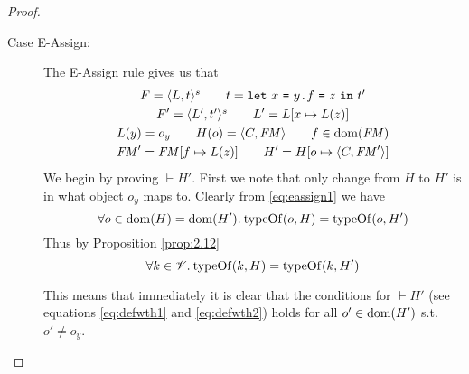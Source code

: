 \begin{proof}
\begin{description}
\begin{description}
\begin{description}
            \item[Case {\sc E-Assign}:] The {\sc E-Assign} rule gives us that
              \begin{equation} \label{eq:eassign1}
                \begin{gathered}
                  F = \mbox{$\langle L, t \rangle^s$} \quad\quad t = \mbox{\mdseries\texttt{let}~$x$~\texttt{=}~$\mbox{\mdseries$y$\texttt{.}$f$~\texttt{=}~$z$}$~\texttt{in}~$t'$} \\
                  F' = \mbox{$\langle L', t' \rangle^s$} \quad\quad L' = L[x \mapsto L(z)] \\
                  L(y) = o_y \quad\quad H(o) = \mbox{$\langle C, \mathit{FM} \rangle$} \quad\quad f \in \mbox{$\mathrm{dom}$}(\mathit{FM})
                  \\
                  \mathit{FM}' = \mathit{FM}[f \mapsto L(z)] \quad\quad H' = H[o \mapsto \mbox{$\langle C, \mathit{FM}' \rangle$}]
                \end{gathered}
              \end{equation}
              We begin by proving $\vdash H'$. First we note
              that only change from $H$ to $H'$ is in what object $o_y$ maps to.
              Clearly from \eqref{eq:eassign1} we have
              \begin{equation} \label{eq:eassign2}
                \forall o \in \mbox{$\mathrm{dom}$}(H) = \mbox{$\mathrm{dom}$}(H'). \: \mbox{$\mathrm{typeOf}$}(o, H) = \mbox{$\mathrm{typeOf}$}(o,
                H')
              \end{equation}
              Thus by Proposition \ref{prop:2.12} 
              \begin{equation} \label{eq:eassign3}
                \forall k \in \mathscr{V}. \: \mbox{$\mathrm{typeOf}$}(k, H) = \mbox{$\mathrm{typeOf}$}(k,
                H')
              \end{equation}
              \begin{addmargin}[1em]{1em}
                \begin{remark}
                  This means that immediately it is clear that the conditions
                  for $\vdash H'$ (see equations \eqref{eq:defwth1} and
                  \eqref{eq:defwth2}) holds for all $o' \in \mbox{$\mathrm{dom}$}(H')$ s.t. $o'
                  \neq o_y$.
                \end{remark}
              \end{addmargin}


\end{description}
\end{description}
\end{description}
\end{proof}

